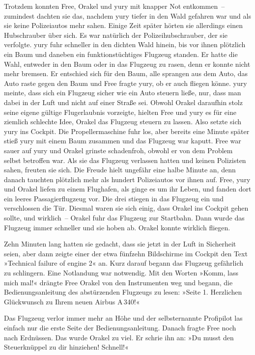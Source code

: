 Trotzdem konnten Free, Orakel und yury mit knapper Not entkommen~– zumindest dachten sie das, nachdem yury tiefer in den Wald gefahren war und als sie keine Polizeiautos mehr sahen. Einige Zeit später hörten sie allerdings einen Hubschrauber über sich. Es war natürlich der Polizeihubschrauber, der sie verfolgte. yury fuhr schneller in den dichten Wald hinein, bis vor ihnen plötzlich ein Baum und daneben ein funktionstüchtiges Flugzeug standen. Er hatte die Wahl, entweder in den Baum oder in das Flugzeug zu rasen, denn er konnte nicht mehr bremsen. Er entschied sich für den Baum, alle sprangen aus dem Auto, das Auto raste gegen den Baum und Free fragte yury, ob er auch fliegen könne. yury meinte, dass sich ein Flugzeug sicher wie ein Auto steuern ließe, nur, dass man dabei in der Luft und nicht auf einer Straße sei. Obwohl Orakel daraufhin stolz seine eigene gültige Flugerlaubnis vorzeigte, hielten Free und yury es für eine ziemlich schlechte Idee, Orakel das Flugzeug steuern zu lassen. Also setzte sich yury ins Cockpit. Die Propellermaschine fuhr los, aber bereits eine Minute später stieß yury mit einem Baum zusammen und das Flugzeug war kaputt. Free war sauer auf yury und Orakel grinste schadenfroh, obwohl er von dem Problem selbst betroffen war. Als sie das Flugzeug verlassen hatten und keinen Polizisten sahen, freuten sie sich. Die Freude hielt ungefähr eine halbe Minute an, denn danach tauchten plötzlich mehr als hundert Polizeiautos vor ihnen auf. Free, yury und Orakel liefen zu einem Flughafen, als ginge es um ihr Leben, und fanden dort ein leeres Passagierflugzeug vor. Die drei stiegen in das Flugzeug ein und verschlossen die Tür. Diesmal waren sie sich einig, dass Orakel ins Cockpit gehen sollte, und wirklich~– Orakel fuhr das Flugzeug zur Startbahn. Dann wurde das Flugzeug immer schneller und sie hoben ab. Orakel konnte wirklich fliegen.

Zehn Minuten lang hatten sie gedacht, dass sie jetzt in der Luft in Sicherheit seien, aber dann zeigte einer der etwa fünfzehn Bildschirme im Cockpit den Text »Technical failure of engine 2« an. Kurz darauf begann das Flugzeug gefährlich zu schlingern. Eine Notlandung war notwendig. Mit den Worten »Komm, lass mich mal!« drängte Free Orakel von den Instrumenten weg und begann, die Bedienungsanleitung des abstürzenden Flugzeugs zu lesen: »Seite 1. Herzlichen Glückwunsch zu Ihrem neuen Airbus A\,340!«

Das Flugzeug verlor immer mehr an Höhe und der selbsternannte Profipilot las einfach nur die erste Seite der Bedienungsanleitung. Danach fragte Free noch nach Erdnüssen. Das wurde Orakel zu viel. Er schrie ihn an: »Du musst den Steuerknüppel zu dir hinziehen! Schnell!«

